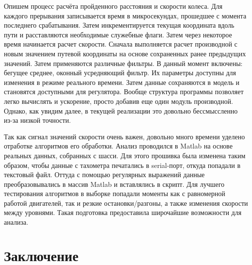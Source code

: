 \documentclass[14pt,a4paper,russian]{scrartcl}
\begin{document}
Опишем процесс расчёта пройденного расстояния и скорости колеса. Для каждого прерывания
записывается время в микросекундах, прошедшее с момента последнего срабатывания.
Затем инкрементируется текущая координата вдоль пути и расставляются необходимые
служебные флаги. Затем через некоторое время начинается расчет скорости. Сначала выполняется
расчет производной с новым значением путевой координаты на основе сохраненных ранее
предыдущих значений. Затем применяются различные фильтры. В данный момент включены: бегущее
среднее, оконный усредняющий фильтр. Их параметры доступны для изменения в режиме
реального времени. Затем данные сохраняются в модель и становятся доступными для регулятора. 
Вообще структура программы позволяет легко вычислять и ускорение, просто добавив
еще один модуль производной. Однако, как увидим далее, в текущей реализации это
довольно бессмыссленно из-за низкой точности.

Так как сигнал значений скорости очень важен, довольно много времени
уделено отработке алгоритмов его обработки. Анализ проводился в Matlab 
на основе реальных данных, собранных с шасси. Для этого прошивка была изменена
таким образом, чтобы данные с тахометра печатались в serial-порт, откуда попадали в текстовый файл.
Оттуда с помощью регулярных выражений данные преобразовывались в массив Matlab и вставлялись в скрипт.
Для лучшего тестирования алгоритмов в выборке попадали моменты как с равномерной работой двигателей,
так и резкие остановки/разгоны, а также изменения скорости между уровнями. 
Такая подготовка предоставила широчайшие возможности для анализа.

\section*{Заключение}

\newpage


\newpage
\end{document}
